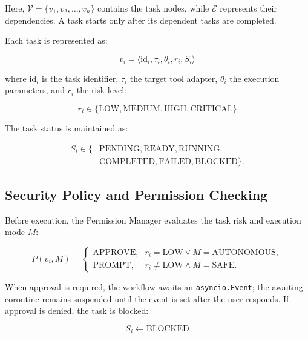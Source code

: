 \documentclass[conference]{IEEEtran}
\begin{document}
Here, $\mathcal{V}=\{v_1,v_2,\ldots,v_n\}$ contains the task nodes, while $\mathcal{E}$ represents their dependencies. A task starts only after its dependent tasks are completed.

Each task is represented as:

\begin{equation}
v_i = \langle \text{id}_i,\tau_i,\theta_i,r_i,S_i\rangle
\end{equation}

where $\text{id}_i$ is the task identifier, $\tau_i$ the target tool adapter, $\theta_i$ the execution parameters, and $r_i$ the risk level:

\begin{equation}
r_i \in \{\text{LOW},\text{MEDIUM},\text{HIGH},\text{CRITICAL}\}
\end{equation}

The task status is maintained as:

\begin{equation}
\begin{aligned}
S_i \in \{&\text{PENDING},\text{READY},\text{RUNNING},\\
          &\text{COMPLETED},\text{FAILED},\text{BLOCKED}\}.
\end{aligned}
\end{equation}

\subsection{Security Policy and Permission Checking}

Before execution, the Permission Manager evaluates the task risk and execution mode $M$:

\begin{equation}
P(v_i,M) =
\begin{cases}
\text{APPROVE}, &
r_i=\text{LOW} \lor M=\text{AUTONOMOUS},\\
\text{PROMPT}, &
r_i\ne\text{LOW} \land M=\text{SAFE}.
\end{cases}
\end{equation}

When approval is required, the workflow awaits an \texttt{asyncio.Event}; the awaiting coroutine remains suspended until the event is set after the user responds. If approval is denied, the task is blocked:

\begin{equation}
S_i \leftarrow \text{BLOCKED}
\end{equation}
\end{document}
